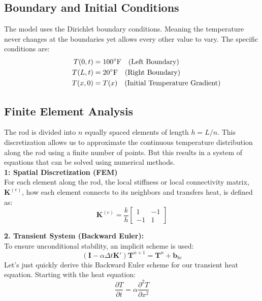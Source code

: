 \documentclass[11pt]{article}
\begin{document}
\begin{onehalfspace}
    \subsection*{Boundary and Initial Conditions}
        The model uses the Dirichlet boundary conditions. Meaning the temperature never changes at the boundaries yet allows every other value to vary. The specific conditions are:
        \begin{align*}
            \hspace{1.5cm} T(0, t) &= 100^\circ\text{F} \quad \text{(Left Boundary)}  \\
            \quad\quad T(L, t) &= 20^\circ\text{F} \quad \text{(Right Boundary)}  \\
            \quad\quad\quad T(x, 0) &= T(x) \quad \text{(Initial Temperature Gradient)} 
        \end{align*}

    \subsection*{Finite Element Analysis}
    The rod is divided into $n$ equally spaced elements of length $h = L/n$. 
    This discretization allows us to approximate the continuous temperature distribution along the rod using a finite number of points. 
    But this results in a system of equations that can be solved using numerical methods. \\
    
    \noindent
    \textbf{1: Spatial Discretization (FEM)} \\
    For each element along the rod, the local stiffness or local connectivity matrix, $\mathbf{K}^{(e)}$, how each element connects to its neighbors and transfers heat, is defined as:
    \[\mathbf{K}^{(e)} = \frac{k}{h} \begin{bmatrix} 1 & -1 \\ -1 & 1 \end{bmatrix}\]

    \noindent
    \textbf{2. Transient System (Backward Euler):} \\
    To ensure unconditional stability, an implicit scheme is used:
    \[(\mathbf{I} - \alpha \Delta t \mathbf{K}') \mathbf{T}^{n+1} = \mathbf{T}^{n} + \mathbf{b}_{bc}\]
    \noindent
    Let's just quickly derive this Backward Euler scheme for our transient heat equation. Starting with the heat equation:
    \[\frac{\partial T}{\partial t} = \alpha \frac{\partial^2 T}{\partial x^2}\]


\end{onehalfspace}
\end{document}
